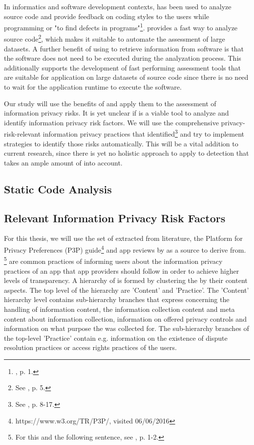 In informatics and software development contexts, \sca has been used to analyze source code and provide feedback on coding styles to the users  while programming or "to find defects in programs"\footnote{\cite{Bardas2010}, p. 1.}.
\Sca provides a fast way to analyze source code\footnote{See \cite{Bardas2010}, p. 5.}, which makes it suitable to automate the assessment of large datasets.
A further benefit of using \sca to retrieve information from software is that the software does not need to be executed during the analyzation process.
This additionally supports the development of fast performing assessment tools that are suitable for application on large datasets of source code since there is no need to wait for the application runtime to execute the software.

Our study will use the benefits of \sca and apply them to the assessment of \mH information privacy risks.
It is yet unclear if \sca is a viable tool to analyze and identify information privacy risk factors.
We will use the comprehensive privacy-risk-relevant information privacy practices that \cite{Dehling2016} identified\footnote{See \cite{Dehling2016}, p. 8-17.} and try to implement \sca strategies to identify those risks automatically.
This will be a vital addition to current research, since there is yet no holistic approach to apply \sca to \ipr detection that takes an ample amount of \iprfs into account.

\subsection{Static Code Analysis}


\subsection{Relevant Information Privacy Risk Factors}


For this thesis, we will use the set of \ipp extracted from literature, the Platform for Privacy Preferences (\acs{P3P}) guide\footnote{https://www.w3.org/TR/P3P/, visited 06/06/2016} and app reviews by \cite{Dehling2016} as a source to derive \iprfs from. \footnote{For this and the following sentence, see \cite{Dehling2016}, p. 1-2.} 
\Ipp are common practices of informing users about the information privacy practices of an app that app providers should follow in order to achieve higher levels of transparency.
A hierarchy of \ipp is formed by clustering the \ipp by their content aspects. 
The top level of the hierarchy are 'Content' and 'Practice'.
The 'Content' hierarchy level contains sub-hierarchy branches that express \ipp concerning the handling of information content, the information collection content and meta content about information collection, information on offered privacy controls and information on what purpose the \ipp was collected for.
The sub-hierarchy branches of the top-level 'Practice' contain e.g. information on the existence of dispute resolution practices or access rights practices of the users.

